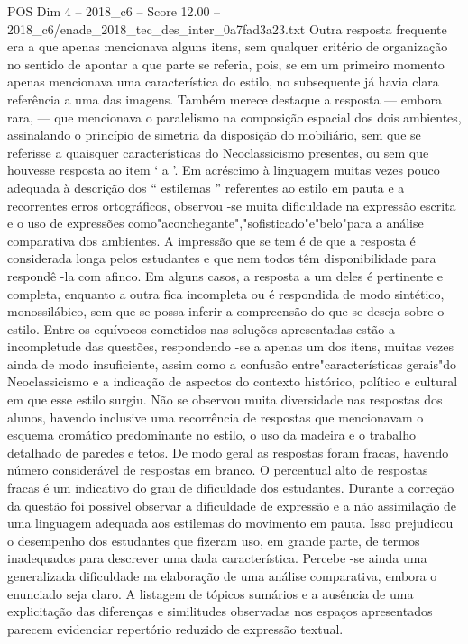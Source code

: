 \begin{textsample}{POS Dim 4 – 2018\_c6 – Score 12.00 – 2018\_c6/enade\_2018\_tec\_des\_inter\_0a7fad3a23.txt}
Outra resposta frequente era a que apenas mencionava alguns itens, sem qualquer critério de organização no sentido de apontar a que parte se referia, pois, se em um primeiro momento apenas mencionava uma característica do estilo, no subsequente já havia clara referência a uma das imagens.
Também merece destaque a resposta — embora rara, — que mencionava o paralelismo na composição espacial dos dois ambientes, assinalando o princípio de simetria da disposição do mobiliário, sem que se referisse a quaisquer características do Neoclassicismo presentes, ou sem que houvesse resposta ao item ‘ a ’.
Em acréscimo à linguagem muitas vezes pouco adequada à descrição dos “ estilemas ” referentes ao estilo em pauta e a recorrentes erros ortográficos, observou -se muita dificuldade na expressão escrita e o uso de expressões como"aconchegante","sofisticado"e"belo"para a análise comparativa dos ambientes.
A impressão que se tem é de que a resposta é considerada longa pelos estudantes e que nem todos têm disponibilidade para respondê -la com afinco.
Em alguns casos, a resposta a um deles é pertinente e completa, enquanto a outra fica incompleta ou é respondida de modo sintético, monossilábico, sem que se possa inferir a compreensão do que se deseja sobre o estilo.
Entre os equívocos cometidos nas soluções apresentadas estão a incompletude das questões, respondendo -se a apenas um dos itens, muitas vezes ainda de modo insuficiente, assim como a confusão entre"características gerais"do Neoclassicismo e a indicação de aspectos do contexto histórico, político e cultural em que esse estilo surgiu.
Não se observou muita diversidade nas respostas dos alunos, havendo inclusive uma recorrência de respostas que mencionavam o esquema cromático predominante no estilo, o uso da madeira e o trabalho detalhado de paredes e tetos.
De modo geral as respostas foram fracas, havendo número considerável de respostas em branco.
O percentual alto de respostas fracas é um indicativo do grau de dificuldade dos estudantes.
Durante a correção da questão foi possível observar a dificuldade de expressão e a não assimilação de uma linguagem adequada aos estilemas do movimento em pauta.
Isso prejudicou o desempenho dos estudantes que fizeram uso, em grande parte, de termos inadequados para descrever uma dada característica.
Percebe -se ainda uma generalizada dificuldade na elaboração de uma análise comparativa, embora o enunciado seja claro.
A listagem de tópicos sumários e a ausência de uma explicitação das diferenças e similitudes observadas nos espaços apresentados parecem evidenciar repertório reduzido de expressão textual.

\end{textsample}

